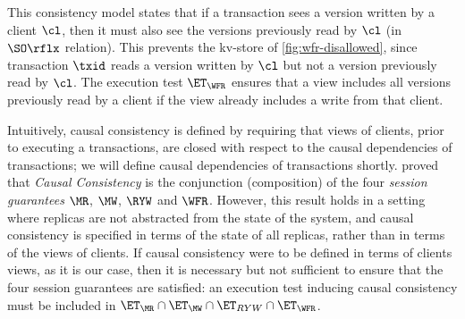 This consistency model states that if a transaction sees a version written by a
client $\cl$, then it must also see the versions previously read by $\cl$ (in $\SO\rflx$ relation).
This prevents the kv-store of \cref{fig:wfr-disallowed},
since transaction $\txid$ reads a version written by $\cl$ but
not a version previously read by $\cl$.
The execution test $\ET_{\WFR}$ ensures
that a view includes all versions previously read by a client 
if the view already includes a write from that client. 

Intuitively, causal consistency is defined by requiring that views of clients, 
prior to executing a transactions, are closed with respect to the causal dependencies 
of transactions; we will define causal dependencies of transactions shortly.
 proved that \emph{Causal Consistency} 
is the conjunction (composition) of the four \emph{session guarantees} \(\MR\), \(\MW\), \(\RYW\) and \(\WFR\). 
However, this result holds in a setting where replicas are not abstracted from the state of the system, and 
causal consistency is specified in terms of the state of all replicas, rather than in terms of the views of clients. 
If causal consistency were to be defined in terms of clients views, as it is our case, then it is necessary but not sufficient to 
ensure that the four session guarantees are satisfied: an execution test inducing causal consistency must 
be included in $\ET_{\MR} \cap \ET_{\MW} \cap \ET_{RYW} \cap \ET_{\WFR}$.

